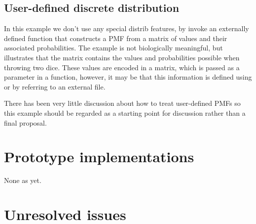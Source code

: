 \documentclass[draftspec]{sbmlpkgspec}
\begin{document}


\subsection{User-defined discrete distribution}
\label{sec:userDefinedDiscrete}

In this example we don't use any special distrib features, by invoke
an externally defined function that constructs a PMF from a matrix of
values and their associated probabilities. The example is not
biologically meaningful, but illustrates that the matrix contains the
values and probabilities possible when throwing two dice. These values
are encoded in a matrix, which is passed as a parameter in a function,
however, it may be that this information is defined using
\numl\contraversial or by referring to an external file.

There has been very little discussion\contraversial{} about how to treat user-defined
PMFs so this example should be regarded as a starting point for
discussion rather than a final proposal.


\section{Prototype implementations}

None as yet.

\section{Unresolved issues}
\label{sec:unresolved}
\end{document}
